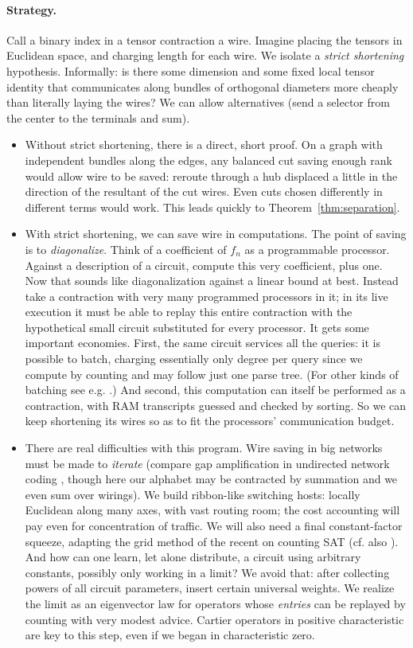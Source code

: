\documentclass[11pt,letterpaper]{article}
\theoremstyle{definition}
\numberwithin{equation}{section}
\begin{document}
\paragraph{Strategy.}
Call a binary index in a tensor contraction a wire. Imagine placing the tensors in
Euclidean space, and charging length for each wire. We isolate a \emph{strict shortening} hypothesis.
Informally: is there some dimension and some fixed local tensor identity that communicates
along bundles of orthogonal diameters more cheaply than literally laying the wires? We can
allow alternatives (send a selector from the center to the terminals and sum).

\begin{itemize}
\item Without strict shortening, there is a direct, short proof. On a graph with independent
bundles along the edges, any balanced cut saving enough rank would allow wire to
be saved: reroute through a hub displaced a little in the direction of the resultant of
the cut wires. Even cuts chosen differently in different terms would work. This leads
quickly to Theorem~\ref{thm:separation}.
\item With strict shortening, we can save wire in computations. The point of saving is
to \emph{diagonalize}. Think of a coefficient of $f_n$ as a programmable processor. Against a
description of a circuit, compute this very coefficient, plus one. Now that sounds like
diagonalization against a linear bound at best. Instead take a contraction with very
many programmed processors in it; in its live execution it must be able to replay this
entire contraction with the hypothetical small circuit substituted for every processor.
It gets some important economies. First, the same circuit services all the queries: it
is possible to batch, charging essentially only degree per query since we compute by
counting and may follow just one parse tree. (For other kinds of batching see e.g.
\cite{Uhlig,Wbatch}.) And second, this computation can itself be performed as a contraction, with
RAM transcripts guessed and checked by sorting. So we can keep shortening its wires
so as to fit the processors' communication budget.
\item There are real difficulties with this program. Wire saving in big networks must be
made to \emph{iterate} (compare gap amplification in undirected network coding \cite{BGS}, though
here our alphabet may be contracted by summation and we even sum over wirings).
We build ribbon-like switching hosts: locally Euclidean along many axes, with vast
routing room; the cost accounting will pay even for concentration of traffic. We will
also need a final constant-factor squeeze, adapting the grid method of the recent \cite{Anthropic3SAT}
on counting SAT (cf. also \cite{Khoruzhii,ETHfalse}). And how can one learn, let alone distribute, a
circuit using arbitrary constants, possibly only working in a limit? We avoid that:
after collecting powers of all circuit parameters, insert certain universal weights. We
realize the limit as an eigenvector law for operators whose \emph{entries} can be replayed by
counting with very modest advice. Cartier operators in positive characteristic are key
to this step, even if we began in characteristic zero.
\end{itemize}
\end{document}
